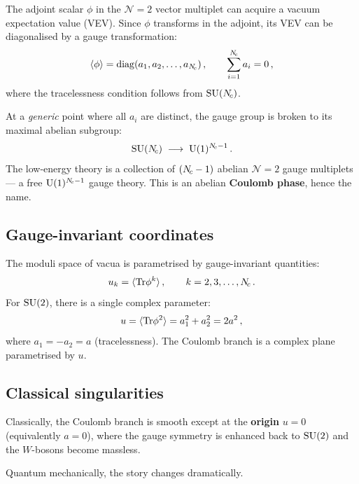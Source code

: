 \documentclass[11pt,a4paper]{article}
\begin{document}
The adjoint scalar $\phi$ in the $\mathcal{N}=2$ vector multiplet can
acquire a vacuum expectation value (VEV).  Since $\phi$ transforms in the
adjoint, its VEV can be diagonalised by a gauge transformation:
\begin{equation}\label{eq:Phi-vev}
  \langle\phi\rangle = \mathrm{diag}(a_1, a_2, \ldots, a_{N_{\!c}})\,,
  \qquad \sum_{i=1}^{N_{\!c}} a_i = 0\,,
\end{equation}
where the tracelessness condition follows from $\mathrm{SU}(N_{\!c})$.

At a \emph{generic} point where all $a_i$ are distinct, the gauge group
is broken to its maximal abelian subgroup:
\begin{equation}\label{eq:coulomb-breaking}
  \mathrm{SU}(N_{\!c}) \;\longrightarrow\; \mathrm{U}(1)^{N_{\!c} - 1}\,.
\end{equation}
The low-energy theory is a collection of $(N_{\!c} - 1)$ abelian
$\mathcal{N}=2$ gauge multiplets --- a free $\mathrm{U}(1)^{N_{\!c}-1}$ gauge
theory.  This is an abelian \textbf{Coulomb phase}, hence the name.

\subsection{Gauge-invariant coordinates}

The moduli space of vacua is parametrised by gauge-invariant quantities:
\begin{equation}\label{eq:uk}
  u_k = \langle\mathrm{Tr}\phi^k\rangle\,,
  \qquad k = 2, 3, \ldots, N_{\!c}\,.
\end{equation}
For $\mathrm{SU}(2)$, there is a single complex parameter:
\begin{equation}\label{eq:u-SU2}
  u = \langle\mathrm{Tr}\phi^2\rangle = a_1^2 + a_2^2 = 2a^2\,,
\end{equation}
where $a_1 = -a_2 = a$ (tracelessness).  The Coulomb branch is a complex
plane parametrised by $u$.

\subsection{Classical singularities}

Classically, the Coulomb branch is smooth except at the \textbf{origin}
$u = 0$ (equivalently $a = 0$), where the gauge symmetry is enhanced
back to $\mathrm{SU}(2)$ and the $W$-bosons become massless.

Quantum mechanically, the story changes dramatically.


\end{document}
